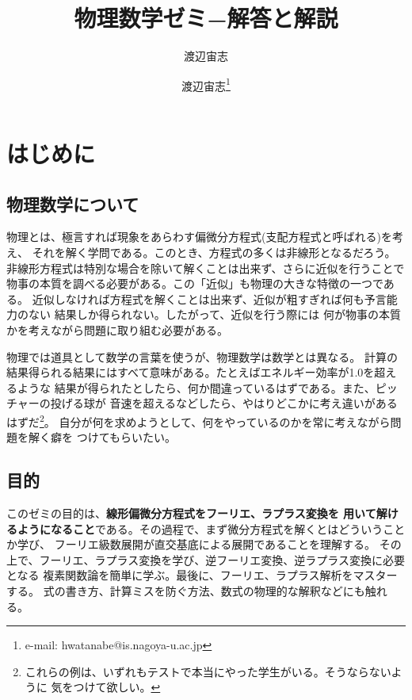 \documentclass{jarticle}
\title{物理数学ゼミ−解答と解説}
\author{渡辺宙志}
\author{渡辺宙志\footnote{e-mail:  hwatanabe@is.nagoya-u.ac.jp}}
\affiliation{名古屋大学大学院情報科学研究科複雑系科学専攻多自由度システム情報論講座}
\begin{document}
\maketitle
\tableofcontents

\newpage
\section{はじめに}

\subsection{物理数学について}

物理とは、極言すれば現象をあらわす偏微分方程式(支配方程式と呼ばれる)を考え、
それを解く学問である。このとき、方程式の多くは非線形となるだろう。
非線形方程式は特別な場合を除いて解くことは出来ず、さらに近似を行うことで
物事の本質を調べる必要がある。この「近似」も物理の大きな特徴の一つである。
近似しなければ方程式を解くことは出来ず、近似が粗すぎれば何も予言能力のない
結果しか得られない。したがって、近似を行う際には
何が物事の本質かを考えながら問題に取り組む必要がある。

物理では道具として数学の言葉を使うが、物理数学は数学とは異なる。
計算の結果得られる結果にはすべて意味がある。たとえばエネルギー効率が1.0を超えるような
結果が得られたとしたら、何か間違っているはずである。また、ピッチャーの投げる球が
音速を超えるなどしたら、やはりどこかに考え違いがあるはずだ\footnote{%
  これらの例は、いずれもテストで本当にやった学生がいる。そうならないように
  気をつけて欲しい。}。
自分が何を求めようとして、何をやっているのかを常に考えながら問題を解く癖を
つけてもらいたい。

\subsection{目的}

このゼミの目的は、{\bf 線形偏微分方程式をフーリエ、ラプラス変換を
用いて解けるようになること}である。その過程で、まず微分方程式を解くとはどういうことか学び、
フーリエ級数展開が直交基底による展開であることを理解する。
その上で、フーリエ、ラプラス変換を学び、逆フーリエ変換、逆ラプラス変換に必要となる
複素関数論を簡単に学ぶ。最後に、フーリエ、ラプラス解析をマスターする。
式の書き方、計算ミスを防ぐ方法、数式の物理的な解釈などにも触れる。
\end{document}
